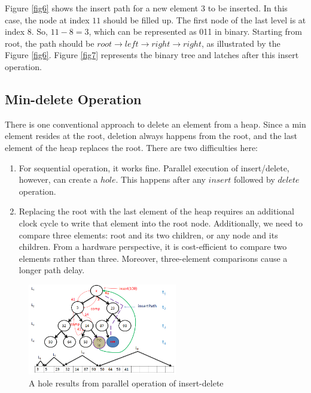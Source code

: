 \documentclass[10pt, conference, compsocconf]{IEEEtran}
\begin{document}
Figure \ref{fig6} shows the insert path for a new element $3$ to be inserted. In this case, the node at index $11$ should be filled up.
The first node of the last level is at index $8$.
So, $11 - 8 = 3$, which can be represented as 011 in binary.
Starting from root, the path should be $root \rightarrow left \rightarrow right \rightarrow right$, as illustrated by the Figure \ref{fig6}. Figure \ref{fig7} represents the binary tree and latches after this insert operation.

\subsection{Min-delete Operation}

There is one conventional approach to delete an element from a heap.
Since a min element resides at the root, deletion always happens from the root, and the last element of the heap replaces the root. There are two difficulties here:

\begin{enumerate}
\item For sequential operation, it works fine. Parallel execution of insert/delete, however, can create a $hole$. This happens after any $insert$ followed by $delete$ operation.
\item Replacing the root with the last element of the heap requires an additional clock cycle to write that element into the root node. Additionally, we need to compare three elements: root and its two children, or any node and its children. From a hardware perspective, it is cost-efficient to compare two elements rather than three. Moreover, three-element comparisons cause a longer path delay.
\end{enumerate}


\begin{figure}[!ht]
  \centering
  \includegraphics[width=6.5cm]{Figures/8.png}
      \caption{A hole results from parallel operation of insert-delete}
    \label{fig8}
\end{figure}
\end{document}
